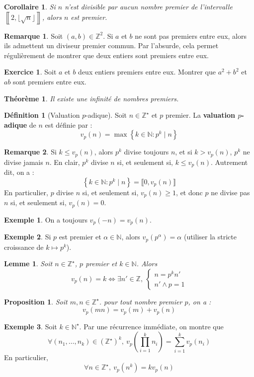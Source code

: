 \documentclass[french]{book}
\newcommand{\N}{\mathbb{N}}
\newcommand{\Z}{\mathbb{Z}}
\newcommand{\st}{^\star}
\theoremstyle{plain}
\newtheorem{thm}{Théorème}[chapter]
\newtheorem{lem}{Lemme}[chapter]
\newtheorem{prop}{Proposition}[chapter]
\newtheorem{cor}{Corollaire}[chapter]
\theoremstyle{definition}
\newtheorem{dfn}{Définition}[chapter]
\newtheorem{exa}{Exemple}[chapter]
\newtheorem{rmq}{Remarque}[chapter]
\newtheorem{exe}{Exercice}[chapter]
\theoremstyle{remark}
\begin{document}
\begin{cor}
	Si $n$ n'est divisible par aucun nombre premier de l'intervalle $\left\llbracket2,\lfloor\sqrt{n}\rfloor\right\rrbracket$, alors $n$ est premier.
\end{cor}
\begin{rmq}
	Soit $(a,b)\in\Z^2$. Si $a$ et $b$ ne sont pas premiers entre eux, alors ils admettent un diviseur premier commun. Par l'absurde, cela permet régulièrement de montrer que deux entiers sont premiers entre eux.
\end{rmq}
\begin{exe}
	Soit $a$ et $b$ deux entiers premiers entre eux. Montrer que $a^2+b^2$ et $ab$ sont premiers entre eux.
\end{exe}
\begin{thm}
	Il existe une infinité de nombres premiers.
\end{thm}
\begin{dfn}[Valuation $p$-adique]
	Soit $n\in\Z\st$ et $p$ premier. La \textbf{valuation $p$-adique} de $n$ est définie par : $$v_p(n)=\max\left\{k\in\N : p^k\mid n\right\}$$
\end{dfn}
\begin{rmq}
	Si $k\leqslant v_p(n)$, alors $p^k$ divise toujours $n$, et si $k>v_p(n)$, $p^k$ ne divise jamais $n$. En clair, $p^k$ divise $n$ si, et seulement si, $k\leqslant v_p(n)$. Autrement dit, on a : $$\left\{k\in\N : p^k\mid n\right\}=\llbracket0,v_p(n)\rrbracket$$ En particulier, $p$ divise $n$ si, et seulement si, $v_p(n)\geqslant1$, et donc $p$ ne divise pas $n$ si, et seulement si, $v_p(n)=0$.
\end{rmq}
\begin{exa}
	On a toujours $v_p(-n)=v_p(n)$.
\end{exa}
\begin{exa}
	Si $p$ est premier et $\alpha\in\N$, alors $v_p(p^\alpha)=\alpha$ (utiliser la stricte croissance de $k\mapsto p^k$).
\end{exa}
\begin{lem}
	Soit $n\in\Z\st$, $p$ premier et $k\in\N$. Alors $$v_p(n)=k \iff \exists n'\in\Z,\ \left \{ \begin{array}{ll}n=p^kn'\\ n'\wedge p=1\end{array}\right.$$
\end{lem}
\begin{prop}
	Soit $m,n\in\Z\st$. pour tout nombre premier $p$, on a : $$v_p(mn)=v_p(m)+v_p(n)$$
\end{prop}
\begin{exa}
	Soit $k\in\N\st$. Par une récurrence immédiate, on montre que $$\forall(n_1,\ldots,n_k)\in\left(\Z\st\right)^k,\ v_p\left(\prod_{i=1}^{k}n_i\right)=\sum_{i=1}^{k}v_p(n_i)$$ En particulier, $$\forall n\in\Z\st,\ v_p(n^k)=kv_p(n)$$
\end{exa}
\end{document}
